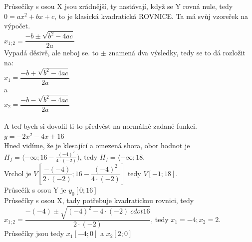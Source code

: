 \documentclass{article}
\begin{document}
Průsečíky s osou X jsou zrádnější, ty nastávají, když se Y rovná nule, tedy $0 = ax^2 + bx + c$, to je klasická kvadratická ROVNICE. Ta má svůj vzoreřek na výpočet.\\
$x_{1;2}=\dfrac{-b\pm \sqrt{b^2-4ac}}{2a}$\\
Vypadá děsivě, ale neboj se. to $\pm$ znamená dva výsledky, tedy se to dá rozložit na:\\
$x_{1}=\dfrac{-b + \sqrt{b^2-4ac}}{2a}$\\
a\\
$x_{2}=\dfrac{-b - \sqrt{b^2-4ac}}{2a}$\\
\vspace*{1pt}\\
A teď bych si dovolil ti to předvést na normálně zadané funkci.\\
$y = -2x^2 - 4x + 16$\\
Hned vidíme, že je klesající a omezená shora, obor hodnot je $H_f = \langle - \infty ; 16 - \frac{(-4)^2}{4 \cdot (-2)})$, tedy $H_f = \langle - \infty ; 18$.\\
Vrchol je $V[\dfrac{-(-4)}{2 \cdot (-2)} ; 16 - \dfrac{(-4)^2}{4 \cdot (-2)}]$ tedy $V[-1 ; 18]$.\\
Průsečík s osou Y je $y_0[0 ; 16]$\\
Průsečíky s osou X, tady potřebuje kvadratickou rovnici, tedy $x_{1;2}=\dfrac{-(-4)\pm \sqrt{(-4)^2-4 \cdot (-2) \ cdot 16}}{2 \cdot (-2)}$, tedy $x_1 = -4; x_2 = 2$.\\
Průsečíky jsou tedy $x_1[-4 ; 0]$ a $x_2[2 ; 0]$
\end{document}
